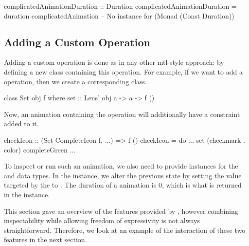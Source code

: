 \begin{spec}
complicatedAnimationDuration :: Duration
complicatedAnimationDuration = duration complicatedAnimation
-- No instance for (Monad (Const Duration))
\end{spec}

\subsection{Adding a Custom Operation}

Adding a custom operation is done as in any other mtl-style approach: by defining a new class containing this operation. For example, if we want to add a  operation, then we create a corresponding  class.

\begin{code}
class Set obj f where
  set :: Lens' obj a -> a -> f ()
\end{code}

Now, an animation containing the  operation will additionally have a  constraint added to it.

\begin{code}
checkIcon :: (Set CompleteIcon f, ...) => f ()
checkIcon = do
  ...
  set (checkmark . color) completeGreen
  ...
\end{code}

To inspect or run such an animation, we also need to provide instances for the  and  data types. In the  instance, we alter the previous state by setting the value targeted by the  to . The duration of a  animation is 0, which is what is returned in the  instance.


This section gave an overview of the features provided by \dsl{}, however combining inspectability while allowing freedom of expressivity is not always straightforward. Therefore, we look at an example of the interaction of these two features in the next section.
